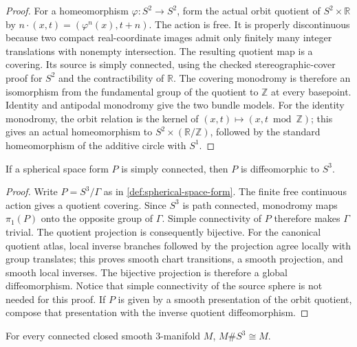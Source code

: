 \begin{proof}
For a homeomorphism $\varphi\colon S^2\to S^2$, form the actual orbit
quotient of $S^2\times\mathbb R$ by
$n\cdot(x,t)=(\varphi^n(x),t+n)$.  The action is free.  It is properly
discontinuous because two compact real-coordinate images admit only finitely
many integer translations with nonempty intersection.  The resulting quotient
map is a covering.  Its source is simply connected, using the checked
stereographic-cover proof for $S^2$ and the contractibility of $\mathbb R$.
The covering monodromy is therefore an isomorphism from the fundamental group
of the quotient to $\mathbb Z$ at every basepoint.  Identity and antipodal
monodromy give the two bundle models.  For the identity monodromy, the orbit
relation is the kernel of $(x,t)\mapsto(x,t\bmod\mathbb Z)$; this gives an
actual homeomorphism to $S^2\times(\mathbb R/\mathbb Z)$, followed by the
standard homeomorphism of the additive circle with $S^1$.
\end{proof}

\begin{lemma}
\label{lem:simply-connected-spherical-space-form}
\leanok
If a spherical space form $P$ is simply connected, then $P$ is diffeomorphic
to $S^3$.
\end{lemma}

\begin{proof}
Write $P=S^3/\Gamma$ as in \ref{def:spherical-space-form}.  The finite free
continuous action gives a quotient covering.  Since $S^3$ is path connected,
monodromy maps $\pi_1(P)$ onto the opposite group of $\Gamma$.
Simple connectivity of $P$ therefore makes $\Gamma$ trivial.  The quotient
projection is consequently bijective.  For the canonical quotient atlas,
local inverse branches followed by the projection agree locally with group
translates; this proves smooth chart transitions, a smooth projection, and
smooth local inverses.  The bijective projection is therefore a global
diffeomorphism.  Notice that simple connectivity of the source sphere is not
needed for this proof.  If $P$ is given by a smooth presentation of the orbit
quotient, compose that presentation with the inverse quotient diffeomorphism.
\end{proof}

\begin{lemma}
\label{lem:three-sphere-connected-sum-identity}
\notready
For every connected closed smooth $3$-manifold $M$,
$M\#S^3\cong M$.
\end{lemma}

